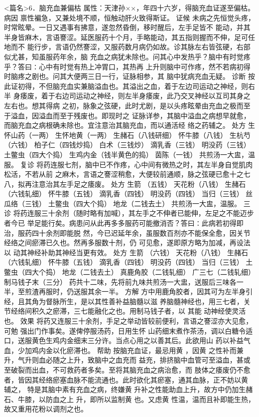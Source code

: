 \documentclass[a4paper,12pt,UTF8,twoside]{ctexbook}
\begin{document}
<篇名>6．脑充血兼偏枯
属性：天津孙××，年四十六岁，得脑充血证遂至偏枯。 
病因 禀性褊急，又兼处境不顺，恒触动肝火致得斯证。 
证候 未病之先恒觉头疼，时常眩晕。一日又遇事有拂意，遂忽然昏倒，移时醒后，左手足皆不 
能动，并其半身皆麻木，言语謇涩。延医服药十个月，手略能动，其五指则握而不伸，足可任地而不 
能行步，言语仍然謇涩，又服药数月病仍如故。诊其脉左右皆弦硬，右部似尤甚，知虽服药年余，脑 
充血之病犹未除也。问其心中发热乎？脑中有时觉疼乎？答曰∶心中有时觉有热上冲胃口，其热再 
上升则脑中可作疼，然不若病初得时脑疼之剧也。问其大便两三日一行，证脉相参，其 
脑中犹病充血无疑。 
诊断 按此证初得，不但脑充血实兼脑溢血也。其溢出之血，着于左边司运动之神经，则右半 
身痿废，着于右边司运动之神经，则左半身痿废，此乃交叉神经以互司其身之左右也。想其得病 
之初，脉象之弦硬，此时尤剧，是以头疼眩晕由充血之极而至于溢血，因溢血而至于残废也。即现时之 
证脉详参，其脑中溢血之病想早就愈，而脑充血之病根确未除也。宜注意治其脑充血，而以通活经 
络之药辅之。 
处方 生怀山药（一两） 生怀地黄（一两） 生赭石（八钱研细） 怀牛膝（八钱） 
生杭芍（六钱） 柏子仁（四钱炒捣） 白术（三钱炒） 滴乳香（三钱） 
明没药（三钱） 土鳖虫（四大个捣） 生鸡内金（钱半黄色的捣） 茵陈（一钱） 
共煎汤一大盅，温服。 
复诊 将药连服七剂，脑中已不作疼，心中间有微热之时，其左半身自觉肌肉松活，不若从前 
之麻木，言语之謇涩稍愈，大便较前通顺，脉之弦硬已愈十之七八，拟再注意治其左手足之痿废。 
处方 生箭 （五钱） 天花粉（八钱） 生赭石（六钱轧细） 怀牛膝（五钱） 
滴乳香（四钱） 明没药（四钱） 当归（三钱） 丝瓜络（三钱） 
土鳖虫（四大个捣） 地龙（二钱去土） 
共煎汤一大盅，温服。 
三诊 将药连服三十余剂（随时略有加喊），其左手之不伸者已能伸，左足之不能迈步者今已 
举足能行矣。病患问从此再多多服药可能撤消否？答曰∶此病若初得即治，服药四十余剂即能脱 
然，今已迟延年余，虽服数百剂亦不能保全愈，因关节经络之间瘀滞已久也。然再多服数十剂，仍 
可见愈，遂即原方略为加减，再设法以 动其神经补助其神经当更有效。 
处方 生箭 （六钱） 天花粉（八钱） 生赭石（六钱轧细） 怀牛膝（五钱） 
滴乳香（四钱） 明没药（四钱） 当归（三钱） 土鳖虫（四大个捣） 
地龙（二钱去土） 真鹿角胶（二钱轧细） 广三七（二钱轧细） 制马钱子末（三分） 
药共十二味，先将前九味共煎汤一大盅，送服后三味各一半，至煎渣再服时，仍送服其余一半。 
方解 方中用鹿角胶者，因其可为左半身引经，且其角为督脉所生，是以其性善补益脑髓以滋 
养脑髓神经也，用三七者，关节经络间积久之瘀滞，三七能融化之也。用制马钱子者，以 
其能 动神经使灵活也。 
效果 将药又连服三十余剂，手足之举动皆较前便利，言语之謇涩亦大见愈，可勉 
强出门作事矣。遂俾停服汤药，日用生怀 
山药细末煮作茶汤，调以白糖令适口，送服黄色生鸡内金细末三分许。当点心用之以善其后。此欲用山 
药以补益气血，少加鸡内金以化瘀滞也。 
帮助 按脑充血证，最忌用黄 ，因黄 之性补而兼升，气升则血必随之上升，致脑中之血充而 
益充，排挤脑中血管可至溢血，甚或至破裂而出血，不可救药者多矣。至将其脑充血之病治愈，而 
肢体之痿废仍不愈者，皆因其经络瘀塞血脉不能流通也。此时欲化其瘀塞，通其血脉，正不妨以黄 辅之， 
特是其脑中素有充血之病，终嫌黄 升补之性能助血上升，故方中仍加生赭石、牛膝，以防血之上 
升，即所以监制黄 也。又虑黄 性温，温而且补即能生热，故又重用花粉以调剂之也。 
\end{document}
